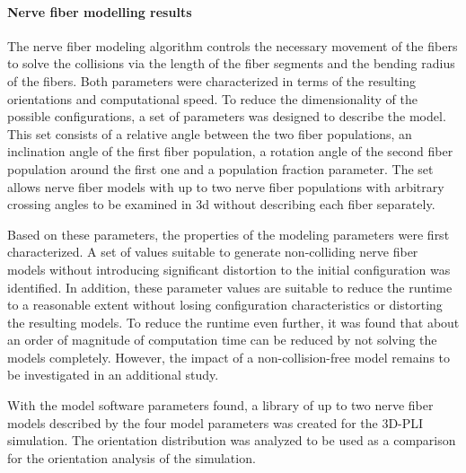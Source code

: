 \paragraph{Nerve fiber modelling results}
% 
The nerve fiber modeling algorithm controls the necessary movement of the fibers to solve the collisions via the length of the fiber segments and the bending radius of the fibers.
Both parameters were characterized in terms of the resulting orientations and computational speed.
To reduce the dimensionality of the possible configurations, a set of parameters was designed to describe the model.
This set consists of a relative angle between the two fiber populations, an inclination angle of the first fiber population, a rotation angle of the second fiber population around the first one and a population fraction parameter.
The set allows nerve fiber models with up to two nerve fiber populations with arbitrary crossing angles to be examined in 3d without describing each fiber separately.
\par
% 
Based on these parameters, the properties of the modeling parameters were first characterized.
A set of values suitable to generate non-colliding nerve fiber models without introducing significant distortion to the initial configuration was identified.
In addition, these parameter values are suitable to reduce the runtime to a reasonable extent without losing configuration characteristics or distorting the resulting models.
To reduce the runtime even further, it was found that about an order of magnitude of computation time can be reduced by not solving the models completely.
However, the impact of a non-collision-free model remains to be investigated in an additional study.
\par
% 
With the model software parameters found, a library of up to two nerve fiber models described by the four model parameters was created for the \ac{3D-PLI} simulation.
The orientation distribution was analyzed to be used as a comparison for the orientation analysis of the simulation.
% 
% 
% 
